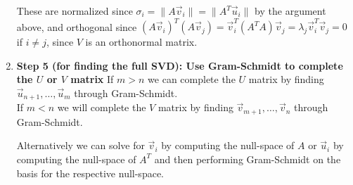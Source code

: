 \begin{enumerate}[label=(\roman*)]
  These are normalized since $\sigma_i = \|A \vec{v}_i\| = \|A^{T} \vec{u}_i \|$ by the argument above, and orthogonal since $(A\vec{v}_i)^T(A\vec{v}_j) = \vec{v}_i^T(A^T A)\vec{v}_j = \lambda_j \vec{v}_i^T\vec{v}_j = 0$ if $i \neq j$, since $V$ is an orthonormal matrix. 

  \item \textbf{Step 5 (for finding the full SVD): Use Gram-Schmidt to complete the $U$ or $V$ matrix} \vskip 1pt
  If $m > n$ we can complete the $U$ matrix by finding $\vec{u}_{n + 1}, \ldots, \vec{u}_{m}$ through Gram-Schmidt. \\
  If $m < n$ we will complete the $V$ matrix by finding $\vec{v}_{m + 1}, \ldots, \vec{v}_{n}$ through Gram-Schmidt.

  Alternatively we can solve for $\vec{v}_{i}$ by computing the null-space of $A$ or $\vec{u}_{i}$ by computing the null-space of $A^{T}$ and then performing Gram-Schmidt on the basis for the respective null-space.

\end{enumerate}

